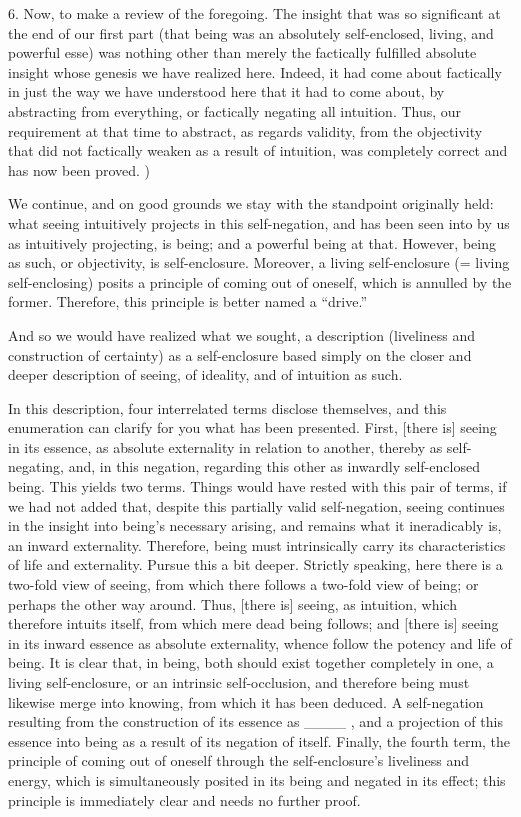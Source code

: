 6. Now, to make a review of the foregoing.
The insight that was so significant
at the end of our first part
(that being was an absolutely
self-enclosed, living, and powerful esse)
was nothing other than merely
the factically fulfilled absolute insight
whose genesis we have realized here.
Indeed, it had come about factically
in just the way we have understood
here that it had to come about,
by abstracting from everything,
or factically negating all intuition.
Thus, our requirement at that time to abstract,
as regards validity, from the objectivity
that did not factically weaken as a result of intuition,
was completely correct and has now been proved.
)

We continue, and on good grounds
we stay with the standpoint originally held:
what seeing intuitively projects in this self-negation,
and has been seen into by us as intuitively projecting,
is being; and a powerful being at that.
However, being as such, or objectivity, is self-enclosure.
Moreover, a living self-enclosure (= living self-enclosing)
posits a principle of coming out of oneself,
which is annulled by the former.
Therefore, this principle is better named a “drive.”

And so we would have realized what we sought,
a description (liveliness and construction of certainty)
as a self-enclosure based simply on
the closer and deeper description of seeing,
of ideality, and of intuition as such.

In this description, four interrelated terms disclose themselves,
and this enumeration can clarify for you what has been presented.
First, [there is] seeing in its essence,
as absolute externality in relation to another,
thereby as self-negating, and, in this negation,
regarding this other as inwardly self-enclosed being.
This yields two terms.
Things would have rested with this pair of terms,
if we had not added that,
despite this partially valid self-negation,
seeing continues in the insight
into being's necessary arising,
and remains what it ineradicably is,
an inward externality.
Therefore, being must intrinsically carry
its characteristics of life and externality.
Pursue this a bit deeper.
Strictly speaking, here there is
a two-fold view of seeing,
from which there follows
a two-fold view of being;
or perhaps the other way around.
Thus, [there is] seeing, as intuition,
which therefore intuits itself,
from which mere dead being follows;
and [there is] seeing in its inward essence
as absolute externality,
whence follow the potency and life of being.
It is clear that, in being,
both should exist together completely in one,
a living self-enclosure,
or an intrinsic self-occlusion,
and therefore being must likewise
merge into knowing,
from which it has been deduced.
A self-negation resulting from
the construction of its essence as ____ ,
and a projection of this essence into being
as a result of its negation of itself.
Finally, the fourth term,
the principle of coming out of oneself
through the self-enclosure's liveliness and energy,
which is simultaneously
posited in its being
and negated in its effect;
this principle is immediately clear
and needs no further proof.

